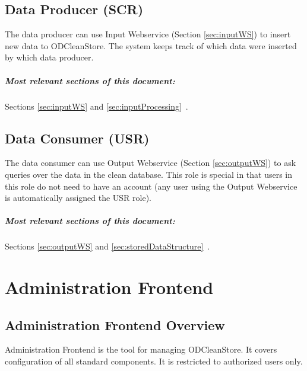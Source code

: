 \section[Data Producer]{Data Producer (SCR)} 
\label{sec:scr}
  The data producer can use Input Webservice (Section \ref{sec:inputWS}) to insert new data to ODCleanStore. The system keeps track of which data were inserted by which data producer.

  \paragraph{Most relevant sections of this document:} Sections \ref{sec:inputWS}  and \linebreak[4] \ref{sec:inputProcessing}~.

\section[Data Consumer]{Data Consumer (USR)} 
\label{sec:usr}
  The data consumer can use Output Webservice (Section \ref{sec:outputWS}) to ask queries over the data in the clean database. This role is special in that users in this role do not need to have an account (any user using the Output Webservice is automatically assigned the USR role).

  \paragraph{Most relevant sections of this document:} Sections \ref{sec:outputWS}  and \linebreak[4] \ref{sec:storedDataStructure}~.


\chapter{Administration Frontend}
\label{chap:administrationFrontend}

\section{Administration Frontend Overview}

Administration Frontend is the tool for managing ODCleanStore. It covers configuration of all standard components. It is restricted to authorized users only. 

